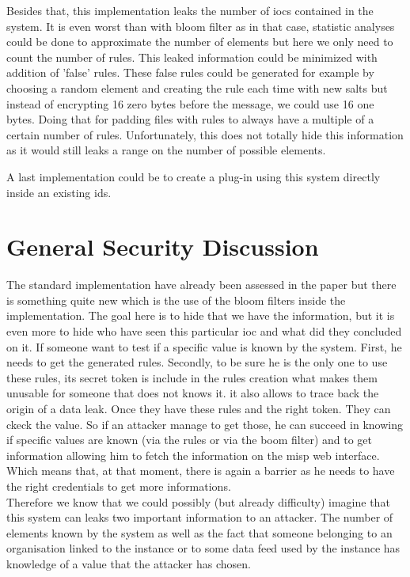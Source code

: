 \documentclass{eplmastersthesis}
\begin{document}
Besides that, this implementation leaks the number of \gls{ioc}s contained in the system. It is even worst than with bloom filter as in that case, statistic analyses could be done to approximate the number of elements but here we only need to count the number of rules. This leaked information could be minimized with addition of 'false' rules.  These false rules could be generated for example by choosing a random element and creating the rule each time with new salts but instead of encrypting 16 zero bytes before the message, we could use 16 one bytes.
Doing that for padding files with rules to always have a multiple of a certain number of rules. Unfortunately, this does not totally hide this information as it would still leaks a range on the number of possible elements.

A last implementation could be to create a plug-in using this system directly inside an existing \gls{ids}.

\section{General Security Discussion}
The standard implementation have already been assessed in the paper  but there is something quite new which is the use of the bloom filters inside the implementation.
The goal here is to hide that we have the information, but it is even more to hide who have seen this particular \gls{ioc} and what did they concluded on it.
If someone want to test if a specific value is known by the system. First, he needs to get the generated rules. Secondly, to be sure he is the only one to use these rules, its secret token is include in the rules creation what makes them unusable for someone that does not knows it. it also allows to trace back the origin of a data leak.
Once they have these rules and the right token. They can ckeck the value. So if an attacker manage to get those, he can succeed in knowing if specific values are known (via the rules or via the boom filter) and to get information allowing him to fetch the information on the \gls{misp} web interface. Which means that, at that moment, there is again a barrier as he needs to have the right credentials to get more informations.\\

Therefore we know that we could possibly (but already difficulty) imagine that this system can leaks two important information to an attacker. The number of elements known by the system as well as the fact that someone belonging to an organisation linked to the instance or to some data feed used by the instance has knowledge of a value that the attacker has chosen.\\
\end{document}
